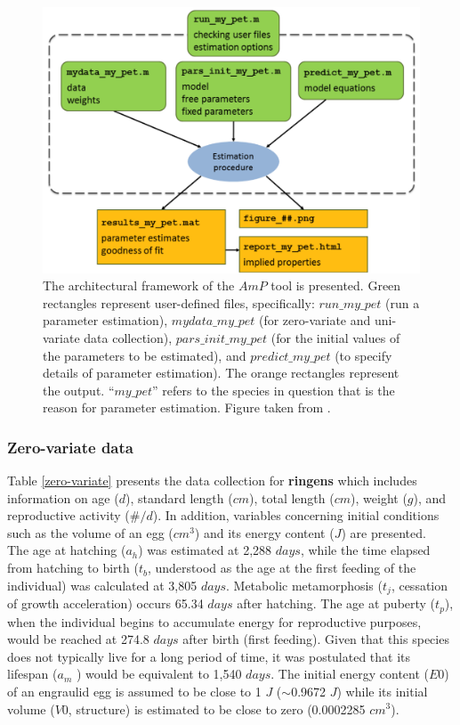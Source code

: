 \begin{figure}[ht]
	\includegraphics[width=1.0\textwidth]{figures/Chap4AmP_flow.png}
	\centering
	\caption{The architectural framework of the $AmP$ tool is presented. Green rectangles represent user-defined files, specifically: \textbf{$run\_my\_pet$} (run a parameter estimation), \textbf{$mydata\_my\_pet$} (for zero-variate and uni-variate data collection), \textbf{$pars\_init\_my\_pet$} (for the initial values of the parameters to be estimated), and \textbf{$predict\_my\_pet$} (to specify details of parameter estimation). The orange rectangles represent the output. ``\textbf{$my\_pet$}'' refers to the species in question that is the reason for parameter estimation. Figure taken from \citep{MarqAugu2018}.}
	\label{Chap4AmP_flow}
\end{figure}

\subsubsection{Zero-variate data}

Table \ref{zero-variate} presents the data collection for \textbf{\gls{ringens}} which includes information on age ($d$), standard length ($cm$), total length ($cm$), weight ($g$), and reproductive activity ($\#/d$). In addition, variables concerning initial conditions such as the volume of an egg ($cm^3$) and its energy content ($J$) are presented.\\

The age at hatching ($a_{h}$) was estimated at 2,288 $days$, while the time elapsed from hatching to birth ($t_{b}$, understood as the age at the first feeding of the individual) was calculated at 3,805 $days$. Metabolic metamorphosis ($t_{j}$, cessation of growth acceleration) occurs 65.34 $days$ after hatching. The age at puberty ($t_{p}$), when the individual begins to accumulate energy for reproductive purposes, would be reached at 274.8 $days$ after birth (first feeding). Given that this species does not typically live for a long period of time, it was postulated that its lifespan ($a_{m}$	) would be equivalent to 1,540 $days$. The initial energy content ($E0$) of an engraulid egg is assumed to be close to 1 $J$ ($\sim$0.9672 $J$) while its initial volume ($V0$, structure) is estimated to be close to zero (0.0002285 $cm^3$).\\

